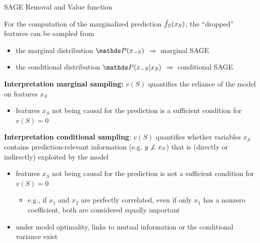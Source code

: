\documentclass[11pt,compress,t,notes=noshow, aspectratio=169, xcolor=table]{beamer}
\begin{document}
\begin{frame}{SAGE Removal and Value function}

For the computation of the marginalized prediction $\fh_S(x_S)$, the ``dropped'' features can be sampled from \\
\begin{itemize}
\item the marginal distribution $\P(x_{-S})$ $\Rightarrow$ marginal SAGE
\item the conditional distribution $\P(x_{-S}|x_S)$ $\Rightarrow$ conditional SAGE
\end{itemize}



\lz\pause

\textbf{Interpretation marginal sampling:} $v(S)$ quantifies the reliance of the model on features $x_S$
\begin{itemize}
  \item features $x_S$ not being causal for the prediction is a sufficient condition for $v(S) = 0$
\end{itemize}

\lz\pause

\textbf{Interpretation conditional sampling}: $v(S)$ quantifies whether variables $x_S$ contains prediction-relevant information (e.g. $y \not \indep x_S$) that is (directly or indirectly) exploited by the model
\begin{itemize}
  \item features $x_S$ not being causal for the prediction is not a sufficient condition for $v(S) = 0$
  \begin{itemize}
      \item e.g., if $x_1$ and $x_2$ are perfectly correlated, even if only $x_1$ has a nonzero coefficient, both are considered equally important
  \end{itemize}
  \item under model optimality, links to mutual information or the conditional variance exist
\end{itemize}

\end{frame}
\end{document}
